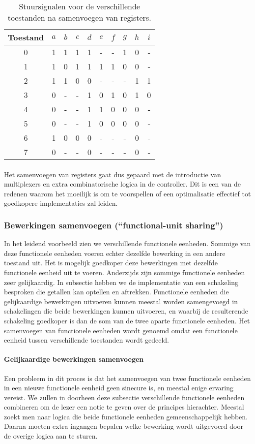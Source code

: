 \begin{table}[hbt]
\centering
\begin{tabular}{c|ccc|cccc|cc}
Toestand&$a$&$b$&$c$&$d$&$e$&$f$&$g$&$h$&$i$\\\hline
0&1&1&1&1&-&-&1&0&-\\
1&1&0&1&1&1&1&0&0&-\\
2&1&1&0&0&-&-&-&1&1\\
3&0&-&-&1&0&1&0&1&0\\
4&0&-&-&1&1&0&0&0&-\\
5&0&-&-&1&0&0&0&0&-\\
6&1&0&0&0&-&-&-&0&-\\
7&0&-&-&0&-&-&-&0&-
\end{tabular}
\caption{Stuursignalen voor de verschillende toestanden na samenvoegen van registers.}
\end{table}
\paragraph{}
Het samenvoegen van registers gaat dus gepaard met de introductie van multiplexers en extra combinatorische logica in de controller. Dit is een van de redenen waarom het moeilijk is om te voorspellen of een optimalisatie effectief tot goedkopere implementaties zal leiden.
\subsubsection{Bewerkingen samenvoegen (``functional-unit sharing'')}
In het leidend voorbeeld zien we verschillende functionele eenheden. Sommige van deze functionele eenheden voeren echter dezelfde bewerking in een andere toestand uit. Het is mogelijk goedkoper deze bewerkingen met dezelfde functionele eenheid uit te voeren. Anderzijds zijn sommige functionele eenheden zeer gelijkaardig. In subsectie  hebben we de implementatie van een schakeling besproken die getallen kan optellen en aftrekken. Functionele eenheden die gelijkaardige bewerkingen uitvoeren kunnen meestal worden samengevoegd in schakelingen die beide bewerkingen kunnen uitvoeren, en waarbij de resulterende schakeling goedkoper is dan de som van de twee aparte functionele eenheden. Het samenvoegen van functionele eenheden wordt  genoemd omdat een functionele eenheid tussen verschillende toestanden wordt gedeeld.
\paragraph{Gelijkaardige bewerkingen samenvoegen}
Een probleem in dit proces is dat het samenvoegen van twee functionele eenheden in een nieuwe functionele eenheid geen sinecure is, en meestal enige ervaring vereist. We zullen in doorheen deze subsectie verschillende functionele eenheden combineren om de lezer een notie te geven over de principes hierachter. Meestal zoekt men naar logica die beide functionele eenheden gemeenschappelijk hebben. Daarna moeten extra ingangen bepalen welke bewerking wordt uitgevoerd door de overige logica aan te sturen.
